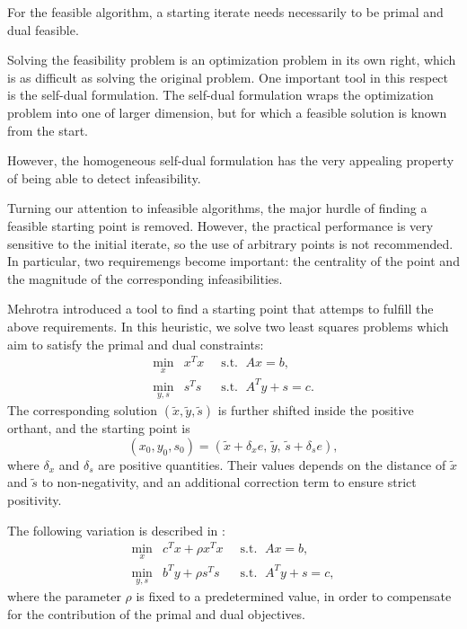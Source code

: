 For the feasible algorithm, a starting iterate needs necessarily 
to be primal and dual feasible.

Solving the feasibility problem is an optimization problem in its
own right, which is as difficult as solving the original problem.
One important tool in this respect is the self-dual formulation.
The self-dual formulation wraps the optimization problem into one 
of larger dimension, but for which a feasible solution is known 
from the start.


However, the homogeneous self-dual formulation has the very
appealing property of being able to detect infeasibility.

Turning our attention to infeasible algorithms, the major hurdle
of finding a feasible starting point is removed. 
However, the practical performance is very sensitive to the initial
iterate, so the use of arbitrary points is not recommended.
In particular, two requiremengs become important: the centrality 
of the point and the magnitude of the corresponding infeasibilities.

Mehrotra \cite{Mehrotra92} introduced a tool to find a starting point 
that attemps to fulfill the above requirements. In this
heuristic, we solve two least squares problems which aim to
satisfy the primal and dual constraints:
\begin{eqnarray*}
  \min_x    \!\! & x^Tx & \;\;\mbox{s.t. }\; Ax = b,      \\
  \min_{y,s}\!\! & s^Ts & \;\;\mbox{s.t. }\; A^Ty + s = c.
\end{eqnarray*}
The corresponding solution $(\tilde x, \tilde y, \tilde s)$ is further 
shifted inside the positive orthant, and the starting point is
\[
(x_0,y_0,s_0) = (\tilde x + \delta_x e,\, \tilde y,\, \tilde s + \delta_s e),
\]
where $\delta_x$ and $\delta_s$ are positive quantities. 
Their values depends on the distance of $\tilde x$ and $\tilde s$
to non-negativity, and an additional correction term to ensure
strict positivity.

The following variation is described in \cite{GondzioTerlaky}:
\begin{eqnarray*} 
  \min_x    \!\! & c^Tx + \rho x^Tx & \;\;\mbox{s.t. }\; Ax = b,      \\
  \min_{y,s}\!\! & b^Ty + \rho s^Ts & \;\;\mbox{s.t. }\; A^Ty + s = c,
\end{eqnarray*}
where the parameter $\rho$ is fixed to a predetermined value, in order
to compensate for the contribution of the primal and dual objectives.

